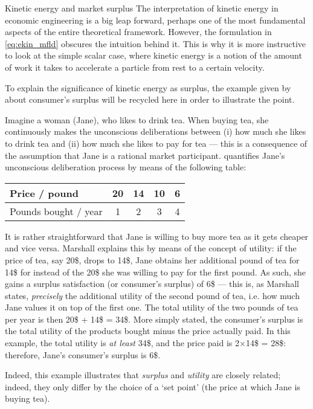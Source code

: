 \begin{econ}{Kinetic energy and market surplus}
    The interpretation of kinetic energy in economic engineering is a big leap forward, perhaps one of the most fundamental aspects of the entire theoretical framework. However, the formulation in \cref{eq:ekin_mfld} obscures the intuition behind it. This is why it is more instructive to look at the simple scalar case, where kinetic energy is a notion of the amount of work it takes to accelerate a particle from rest to a certain velocity.

    To explain the significance of kinetic energy as surplus, the example given by \citet[chap.~6]{Marshall1920} about consumer's surplus will be recycled here in order to illustrate the point.

    Imagine a woman (Jane), who likes to drink tea. When buying tea, she continuously makes the unconscious deliberations between (i) how much she likes to drink tea and (ii) how much she likes to pay for tea --- this is a consequence of the assumption that Jane is a rational market participant. \citeauthor{Marshall1920} quantifies Jane's unconscious deliberation process by means of the following table:
    \begin{center}
        \begin{tabular}{lcccc}
            Price / pound & 20 & 14 & 10 & 6 \\
            \midrule
            Pounds bought / year & 1 & 2 & 3 & 4 \\
        \end{tabular}
    \end{center}
    It is rather straightforward that Jane is willing to buy more tea as it gets cheaper and vice versa. Marshall explains this by means of the concept of utility: if the price of tea, say 20\$, drops to 14\$, Jane obtains her additional pound of tea for 14\$ for instead of the 20\$ she was willing to pay for the first pound. As such, she gains a surplus satisfaction (or consumer's surplus) of 6\$ --- this is, as Marshall states, \emph{precisely} the additional utility of the second pound of tea, i.e. how much Jane values it on top of the first one. The total utility of the two pounds of tea per year is then 20\$ +  14\$ = 34\$. More simply stated, the consumer's surplus is the total utility of the products bought minus the price actually paid. In this example, the total utility is \emph{at least} 34\$, and the price paid is 2$\times$14\$ = 28\$: therefore, Jane's consumer's surplus is 6\$. 
    \begin{center}
        
    \end{center}
    Indeed, this example illustrates that \emph{surplus} and \emph{utility} are closely related; indeed, they only differ by the choice of a `set point' (the price at which Jane is buying tea). 


\end{econ}
